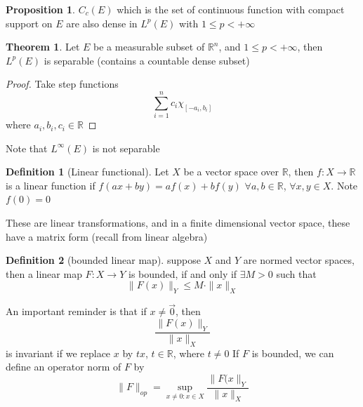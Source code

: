 \documentclass[12pt]{article}
\theoremstyle{definition}
\newtheorem{theorem}{Theorem}[section]
\newtheorem{proposition}{Proposition}[section]
\newtheorem{definition}{Definition}[section]
\begin{document}
	\begin{proposition}
		$C_c(E)$ which is the set of continuous function with compact support on $E$ are also dense in $L^p(E)$ with $1 \leq p < +\infty$
	\end{proposition}
	\begin{theorem}
		Let $E$ be a measurable subset of $\mathbb{R}^n$, and $1 \leq p < +\infty$, then $L^p(E)$ is separable (contains a countable dense subset)

	\end{theorem}
	\begin{proof}
		Take step functions 
		\[
			\sum_{i=1}^n c_i \chi_{[-a_i,b_i]}
		\]
		where $a_i,b_i,c_i \in \mathbb{R}$
	\end{proof}
	Note that $L^\infty(E)$ is not separable

	\begin{definition}[Linear functional]
		Let $X$ be a vector space over $\mathbb{R}$, then $f \colon X \to \mathbb{R}$ is a linear function if $f(ax+by) = af(x) + bf(y)$ $\forall a,b \in \mathbb{R}$, $\forall x,y \in X$. Note $f(0) = 0$
	\end{definition}
	These are linear transformations, and in a finite dimensional vector space, these have a matrix form (recall from linear algebra)

	\begin{definition}[bounded linear map]
		suppose $X$ and $Y$ are normed vector spaces, then a linear map $F \colon X \to Y$ is bounded, if and only if $\exists M >0$ such that 
		$$\|F(x)\|_Y\leq M\cdot \|x\|_X$$ 



	\end{definition}
	An important reminder is that if $x \neq \vec{0}$, then 
	$$
	\frac{\|F(x)\|_Y}{\|x\|_X}
	$$
	is invariant if we replace $x$ by $t x$, $t \in \mathbb{R}$, where $t \neq 0$
	If $F$ is bounded, we can define an operator norm of $F$ by 
	$$\|F\|_{op} = \sup_{x \neq 0 \colon x \in X} \frac{\|F(x\|_Y}{\|x\|_X}$$
\end{document}

